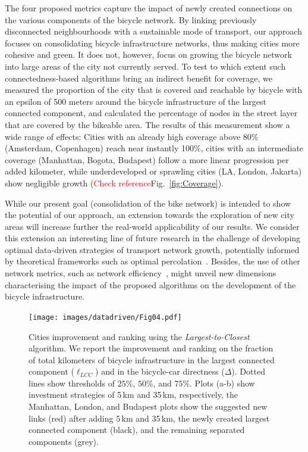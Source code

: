 The four proposed metrics capture the impact of newly created connections on the various components of the bicycle network. By linking previously disconnected neighbourhoods with a sustainable mode of transport, our approach focuses on consolidating bicycle infrastructure networks, thus making cities more cohesive and green. It does not, however, focus on growing the bicycle network into large areas of the city not currently served. To test to which extent such connectedness-based algorithms bring an indirect benefit for coverage, we measured the proportion of the city that is covered and reachable by bicycle with an epsilon of 500 meters around the bicycle infrastructure of the largest connected component, and calculated the percentage of nodes in the street layer that are covered by the bikeable area. The results of this measurement show a wide range of effects: Cities with an already high coverage above 80\% (Amsterdam, Copenhagen) reach near instantly 100\%, cities with an intermediate coverage (Manhattan, Bogota, Budapest) follow a more linear progression per added kilometer, while underdeveloped or sprawling cities (LA, London, Jakarta) show negligible growth (\textcolor{red}{Check reference}Fig.~\ref{fig:Coverage}).

While our present goal (consolidation of the bike network) is intended to show the potential of our approach, an extension towards the exploration of new city areas will increase further the real-world applicability of our results. We consider this extension an interesting line of future research in the challenge of developing optimal data-driven strategies of transport network growth, potentially informed by theoretical frameworks such as optimal percolation~\cite{achlioptas2009explosive,morone2015influence}. Besides, the use of other network metrics, such as network efficiency~\cite{latora2000efficient}, might unveil new dimensions characterising the impact of the proposed algorithms on the development of the bicycle infrastructure.

\begin{figure}[htbp]
  \centering
  \texttt{[image: images/datadriven/Fig04.pdf]}
  \caption[Cities bicycle connectivity improvement]{Cities improvement and ranking using the \emph{Largest-to-Closest} algorithm. We report the improvement and ranking on the fraction of total kilometers of bicycle infrastructure in the largest connected component ($\ell_{LCC}$) and in the bicycle-car directness ($\Delta$). Dotted lines show thresholds of $25\%$, $50\%$, and $75\%$. Plots (a-b) show investment strategies of 5\,km and 35\,km, respectively, the Manhattan, London, and Budapest plots show the suggested new links (red) after adding 5\,km and 35\,km, the newly created largest connected component (black), and the remaining separated components (grey).}
  \label{fig:Improvement}
\end{figure}

